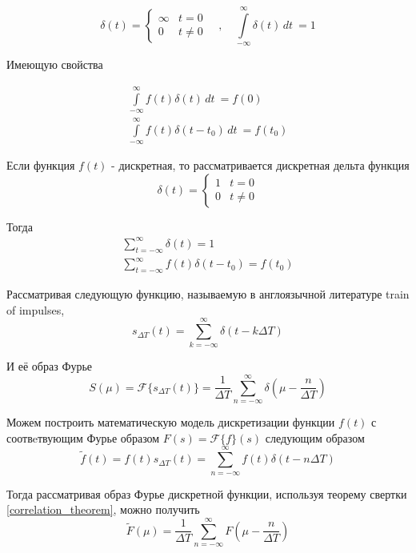 \documentclass[oneside,final,14pt]{extreport}
\begin{document}
\begin{equation*}
\delta(t)=
\begin{cases}
\infty & t = 0 \\
0	 & t \neq 0
\end{cases}
\quad , \quad
{\int\limits_{-\infty}^{\infty}\delta(t)\,dt~}
=
1
\end{equation*}

Имеющую свойства

\begin{gather*}
{\int\limits_{-\infty}^{\infty}f(t)\delta(t)\,dt~}
=
f(0)
\\
{\int\limits_{-\infty}^{\infty}f(t)\delta(t-t_{0})\,dt~}
=
f(t_{0})
\end{gather*}

Если функция $f(t)$ - дискретная, то рассматривается дискретная дельта функция 
\begin{equation}
\delta(t)=
\begin{cases}
1 & t = 0 \\
0	 & t \neq 0
\end{cases}
\end{equation}

Тогда
\begin{gather}
\sum_{t = - \infty}^{\infty} \delta(t) 
=
1
\\
\sum_{t = - \infty}^{\infty} f(t) 
\delta(t - t_{0}) 
=
f(t_{0})
\end{gather} 

Рассматривая следующую функцию, называемую в англоязычной литературе train of impulses,
\begin{equation}
s_{\varDelta T}(t) 
=
\sum_{k=-\infty}^{\infty}
\delta(t - k\varDelta T)
\end{equation}

И её образ Фурье 
\begin{equation}
S(\mu) = \mathcal{F}
\{ s_{\varDelta T}(t)  \}
=
\frac{1}{\varDelta T}
\sum_{n = - \infty}^{\infty}
\delta(
\mu - \frac{n}{\varDelta T}
)
\end{equation}

Можем построить математическую модель дискретизации
функции $f(t)$ с соотвeтвующим Фурье образом $F(s) = \mathcal{F}\{f\}(s)$  следующим образом
\begin{equation}
\tilde{f}(t) = 
f(t)s_{\varDelta T}(t)
=
\sum_{n = -\infty}^{\infty}
f(t)
\delta(t - n\varDelta T)
\end{equation}

Тогда рассматривая образ Фурье дискретной функции, используя теорему свертки \ref{correlation_theorem},  можно получить \cite{Gonzalez}
\begin{equation}
\tilde{F}(\mu) = 
\frac{1}{\varDelta T}
\sum_{n = - \infty}^{\infty}
F(
\mu - \frac{n}{\varDelta T}
)
\label{Furier_sampling_result}
\end{equation}
\end{document}
